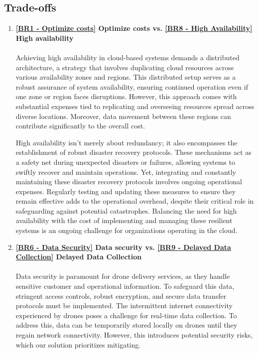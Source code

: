 \documentclass{article}
\begin{document}
\subsection{Trade-offs}
\begin{enumerate}
    \item \textbf{\ref{BR1 - Optimize costs} Optimize costs vs. \ref{BR8 - High Availability} High availability} \\\\
    Achieving high availability in cloud-based systems demands a distributed architecture, a strategy that involves duplicating cloud resources across various availability zones and regions. This distributed setup serves as a robust assurance of system availability, ensuring continued operation even if one zone or region faces disruptions. However, this approach comes with substantial expenses tied to replicating and overseeing resources spread across diverse locations. Moreover, data movement between these regions can contribute significantly to the overall cost. 

    High availability isn't merely about redundancy; it also encompasses the establishment of robust disaster recovery protocols. These mechanisms act as a safety net during unexpected disasters or failures, allowing systems to swiftly recover and maintain operations. Yet, integrating and constantly maintaining these disaster recovery protocols involves ongoing operational expenses. Regularly testing and updating these measures to ensure they remain effective adds to the operational overhead, despite their critical role in safeguarding against potential catastrophes. Balancing the need for high availability with the cost of implementing and managing these resilient systems is an ongoing challenge for organizations operating in the cloud.

    \item \textbf{\ref{BR6 - Data Security} Data security vs. \ref{BR9 - Delayed Data Collection} Delayed Data Collection}\\\\
    Data security is paramount for drone delivery services, as they handle sensitive customer and operational information. To safeguard this data, stringent access controls, robust encryption, and secure data transfer protocols must be implemented. The intermittent internet connectivity experienced by drones poses a challenge for real-time data collection. To address this, data can be temporarily stored locally on drones until they regain network connectivity. However, this introduces potential security risks, which our solution prioritizes mitigating.


\end{enumerate}
\end{document}
